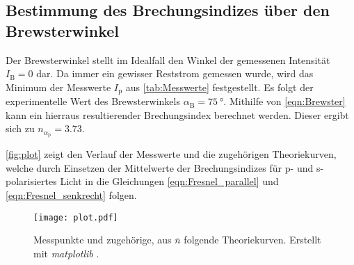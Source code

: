 \subsection{Bestimmung des Brechungsindizes über den Brewsterwinkel}
\label{subsec:Brewsterwinkel}
Der Brewsterwinkel stellt im Idealfall den Winkel der gemessenen Intensität $I_\text{B} = 0$ dar. Da immer ein gewisser Reststrom gemessen wurde,
wird das Minimum der Messwerte $I_\text{p}$ aus \autoref{tab:Messwerte} festgestellt.
Es folgt der experimentelle Wert des Brewsterwinkels $\alpha_\text{B} = \qty{75}{\degree}$.
Mithilfe von \autoref{eqn:Brewster} kann ein hierraus resultierender Brechungsindex berechnet werden. Dieser ergibt sich zu $n_{\alpha_{\text{p}}} = \num{3.73}$.

\autoref{fig:plot} zeigt den Verlauf der Messwerte und die zugehörigen Theoriekurven, welche durch Einsetzen der Mittelwerte der Brechungsindizes für p- und 
s-polarisiertes Licht in die Gleichungen \eqref{eqn:Fresnel_parallel} und \eqref{eqn:Fresnel_senkrecht} folgen.

\begin{figure}
  \centering
  \texttt{[image: plot.pdf]}
  \caption{Messpunkte und zugehörige, aus $\overline{n}$ folgende Theoriekurven. Erstellt mit \textit{matplotlib} \cite{matplotlib}.}
  \label{fig:plot}
\end{figure}

